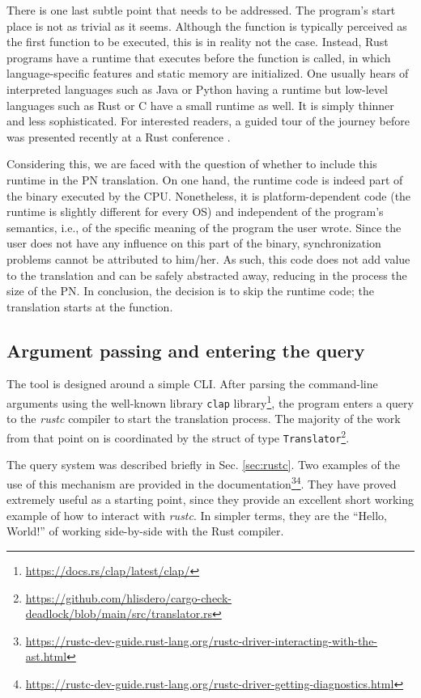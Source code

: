 There is one last subtle point that needs to be addressed.
The program's start place is not as trivial as it seems.
Although the  function is typically perceived
as the first function to be executed,
this is in reality not the case.
Instead, Rust programs have a runtime that executes
before the  function is called,
in which language-specific features and static memory are initialized.
One usually hears of interpreted languages such as Java or Python having a runtime
but low-level languages such as Rust or C have a small runtime as well.
It is simply thinner and less sophisticated.
For interested readers, a guided tour of the journey before 
was presented recently at a Rust conference \cite{levick2022}.

Considering this, we are faced with the question of
whether to include this runtime in the \acrshort{PN} translation.
On one hand, the runtime code is indeed part of the binary executed by the \acrshort{CPU}.
Nonetheless, it is platform-dependent code
(the runtime is slightly different for every \acrshort{OS})
and independent of the program's semantics,
i.e., of the specific meaning of the program the user wrote.
Since the user does not have any influence on this part of the binary,
synchronization problems cannot be attributed to him/her.
As such, this code does not add value to the translation
and can be safely abstracted away,
reducing in the process the size of the \acrshort{PN}.
In conclusion, the decision is to skip the runtime code;
the translation starts at the  function.

\subsection{Argument passing and entering the query}

The tool is designed around a simple \acrfull{CLI}.
After parsing the command-line arguments using the well-known
library \texttt{clap} library\footnote{\url{https://docs.rs/clap/latest/clap/}},
the program enters a query to the \emph{rustc} compiler
to start the translation process.
The majority of the work from that point on is coordinated
by the struct of type \texttt{Translator}\footnote{\url{https://github.com/hlisdero/cargo-check-deadlock/blob/main/src/translator.rs}}.

The query system was described briefly in Sec. \ref{sec:rustc}.
Two examples of the use of this mechanism are provided in the
documentation\footnote{\url{https://rustc-dev-guide.rust-lang.org/rustc-driver-interacting-with-the-ast.html}}\footnote{\url{https://rustc-dev-guide.rust-lang.org/rustc-driver-getting-diagnostics.html}}.
They have proved extremely useful as a starting point,
since they provide an excellent short working example of
how to interact with \emph{rustc}.
In simpler terms, they are the ``Hello, World!''
of working side-by-side with the Rust compiler.

